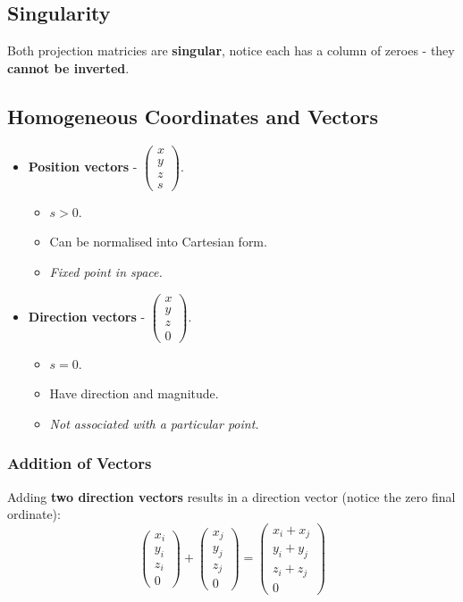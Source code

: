 \documentclass[11pt]{article}
\begin{document}
\subsection{Singularity}
Both projection matricies are \textbf{singular}, notice each has a column of zeroes - they \textbf{cannot be inverted}.

\subsection{Homogeneous Coordinates and Vectors}
\begin{itemize}
  \item \textbf{Position vectors} - $\begin{pmatrix} x \\ y \\ z \\ s \end{pmatrix}$.
    \begin{itemize}
      \item $s > 0$.
      \item Can be normalised into Cartesian form.
      \item \textit{Fixed point in space.}
    \end{itemize}
  \item \textbf{Direction vectors} - $\begin{pmatrix} x \\ y \\ z \\ 0 \end{pmatrix}$.
    \begin{itemize}
      \item $s = 0$.
      \item Have direction and magnitude.
      \item \textit{Not associated with a particular point.}
    \end{itemize}
\end{itemize}

\subsubsection{Addition of Vectors}
Adding \textbf{two direction vectors} results in a direction vector (notice the zero final ordinate):
\[
  \begin{pmatrix} x_i \\ y_i \\ z_i \\ 0 \end{pmatrix} 
  +
  \begin{pmatrix} x_j \\ y_j \\ z_j \\ 0 \end{pmatrix} 
  =
  \begin{pmatrix} x_i + x_j \\ y_i + y_j \\ z_i + z_j \\ 0 \end{pmatrix} 
\]
\end{document}
